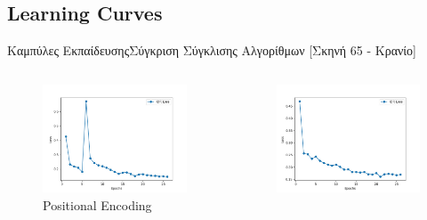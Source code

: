 \documentclass[10pt]{beamer}
\begin{document}
\subsection{Learning Curves}
\begin{frame}{Καμπύλες Εκπαίδευσης}{Σύγκριση Σύγκλισης Αλγορίθμων [Σκηνή 65 - Κρανίο]}
    \begin{columns}[T]
            \begin{figure}
            \includegraphics[height = .2\textheight]{images/chapter5_img/LossPlots/Total_Loss_First_50-100_Epochs/loss_plot_PositionalEncoding.jpg}
            \caption{Positional Encoding}
            \end{figure}
            \begin{figure}
            \includegraphics[height = .2\textheight]{images/chapter5_img/LossPlots/Total_Loss_First_50-100_Epochs/loss_plot_FourierFeatures.jpg}

\end{figure}
\end{columns}
\end{frame}
\end{document}
